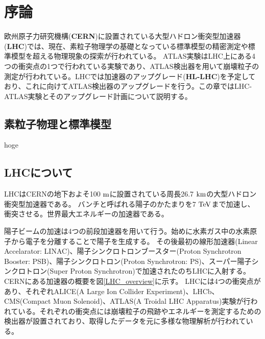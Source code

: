 \chapter{序論}
欧州原子力研究機構(\textbf{CERN})に設置されている大型ハドロン衝突型加速器(\textbf{LHC})では、現在、素粒子物理学の基礎となっている標準模型の精密測定や標準模型を超える物理現象の探索が行われている。
ATLAS実験はLHC上にある4つの衝突点の1つで行われている実験であり、ATLAS検出器を用いて崩壊粒子の測定が行われている。LHCでは加速器のアップグレード(\textbf{HL-LHC})を予定しており、これに向けてATLAS検出器のアップグレードを行う。この章ではLHC-ATLAS実験とそのアップグレード計画について説明する。

\section{素粒子物理と標準模型}
hoge

\section{LHCについて}
LHCはCERNの地下およそ100 $\rm{m}$に設置されている周長26.7 $\rm{km}$の大型ハドロン衝突型加速器である。
バンチと呼ばれる陽子のかたまりを7 $\rm{TeV}$まで加速し、衝突させる。世界最大エネルギーの加速器である。

陽子ビームの加速は4つの前段加速器を用いて行う。始めに水素ガス中の水素原子から電子を分離することで陽子を生成する。
その後最初の線形加速器(Linear Accelarator: LINAC)、陽子シンクロトロンブースター(Proton Synchrotron Booster: PSB)、陽子シンクロトロン(Proton Synchrotron: PS)、スーパー陽子シンクロトロン(Super Proton Synchrotron)で加速されたのちLHCに入射する。CERNにある加速器の概要を図\ref{LHC_overview}に示す。
LHCには4つの衝突点があり、それぞれALICE(A Large Ion Collider Experiment)、LHCb、CMS(Compact Muon Solenoid)、ATLAS(A
Troidal LHC Apparatus)実験が行われている。それぞれの衝突点には崩壊粒子の飛跡やエネルギーを測定するための検出器が設置されており、取得したデータを元に多様な物理解析が行われている。

